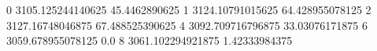 0 3105.125244140625 45.4462890625
1 3124.10791015625 64.428955078125
2 3127.16748046875 67.488525390625
4 3092.709716796875 33.03076171875
6 3059.678955078125 0.0
8 3061.102294921875 1.42333984375
